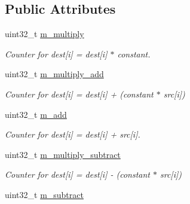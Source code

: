 \subsection*{Public Attributes}
\begin{DoxyCompactItemize}
\item 
\hypertarget{structkodo_1_1operations__counter_a5005fac5515772ee489caf1b85c8059c}{uint32\-\_\-t \hyperlink{structkodo_1_1operations__counter_a5005fac5515772ee489caf1b85c8059c}{m\-\_\-multiply}}\label{structkodo_1_1operations__counter_a5005fac5515772ee489caf1b85c8059c}

\begin{DoxyCompactList}\small\item\em Counter for dest\mbox{[}i\mbox{]} = dest\mbox{[}i\mbox{]} $\ast$ constant. \end{DoxyCompactList}\item 
\hypertarget{structkodo_1_1operations__counter_a8aba214c251ea6d6b412a1317beddfb6}{uint32\-\_\-t \hyperlink{structkodo_1_1operations__counter_a8aba214c251ea6d6b412a1317beddfb6}{m\-\_\-multiply\-\_\-add}}\label{structkodo_1_1operations__counter_a8aba214c251ea6d6b412a1317beddfb6}

\begin{DoxyCompactList}\small\item\em Counter for dest\mbox{[}i\mbox{]} = dest\mbox{[}i\mbox{]} + (constant $\ast$ src\mbox{[}i\mbox{]}) \end{DoxyCompactList}\item 
\hypertarget{structkodo_1_1operations__counter_af91f5aaa80d7e7cfae02a5b04edc9272}{uint32\-\_\-t \hyperlink{structkodo_1_1operations__counter_af91f5aaa80d7e7cfae02a5b04edc9272}{m\-\_\-add}}\label{structkodo_1_1operations__counter_af91f5aaa80d7e7cfae02a5b04edc9272}

\begin{DoxyCompactList}\small\item\em Counter for dest\mbox{[}i\mbox{]} = dest\mbox{[}i\mbox{]} + src\mbox{[}i\mbox{]}. \end{DoxyCompactList}\item 
\hypertarget{structkodo_1_1operations__counter_a060cfafc1b930774b7ff787cedfdf66b}{uint32\-\_\-t \hyperlink{structkodo_1_1operations__counter_a060cfafc1b930774b7ff787cedfdf66b}{m\-\_\-multiply\-\_\-subtract}}\label{structkodo_1_1operations__counter_a060cfafc1b930774b7ff787cedfdf66b}

\begin{DoxyCompactList}\small\item\em Counter for dest\mbox{[}i\mbox{]} = dest\mbox{[}i\mbox{]} -\/ (constant $\ast$ src\mbox{[}i\mbox{]}) \end{DoxyCompactList}\item 
\hypertarget{structkodo_1_1operations__counter_a0de89f8a42cbce225340cbb375ceea7a}{uint32\-\_\-t \hyperlink{structkodo_1_1operations__counter_a0de89f8a42cbce225340cbb375ceea7a}{m\-\_\-subtract}}\label{structkodo_1_1operations__counter_a0de89f8a42cbce225340cbb375ceea7a}


\end{DoxyCompactItemize}
